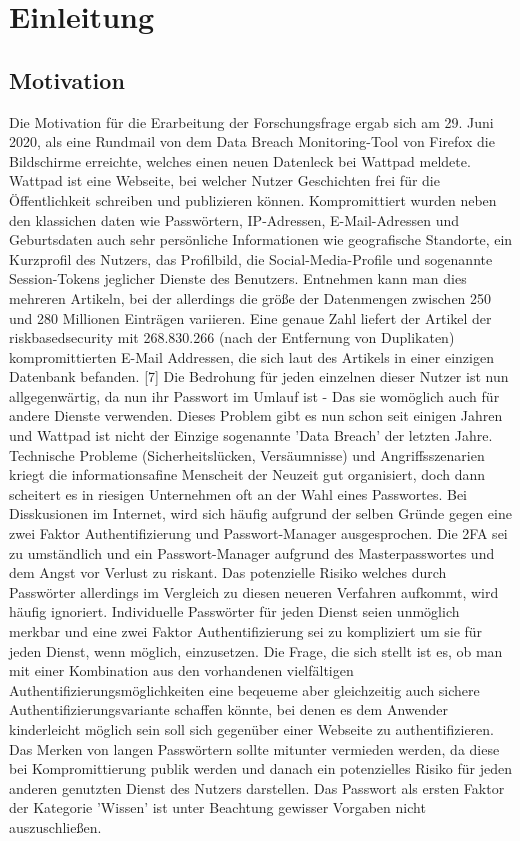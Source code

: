 \chapter{Einleitung}

\section{Motivation}
Die Motivation für die Erarbeitung der Forschungsfrage ergab sich am 29. Juni 2020, als eine Rundmail von dem Data Breach Monitoring-Tool von Firefox die Bildschirme erreichte, welches einen neuen Datenleck bei Wattpad meldete. Wattpad ist eine Webseite, bei welcher Nutzer Geschichten frei für die Öffentlichkeit schreiben und publizieren können. Kompromittiert wurden neben den klassichen daten wie Passwörtern, IP-Adressen, E-Mail-Adressen und Geburtsdaten auch sehr persönliche Informationen wie geografische Standorte, ein Kurzprofil des Nutzers, das Profilbild, die Social-Media-Profile und sogenannte Session-Tokens jeglicher Dienste des Benutzers. Entnehmen kann man dies mehreren Artikeln, bei der allerdings die größe der Datenmengen zwischen 250 und 280 Millionen Einträgen variieren. Eine genaue Zahl liefert der Artikel der riskbasedsecurity mit 268.830.266 (nach der Entfernung von Duplikaten) kompromittierten E-Mail Addressen, die sich laut des Artikels in einer einzigen Datenbank befanden. [7] Die Bedrohung für jeden einzelnen dieser Nutzer ist nun allgegenwärtig, da nun ihr Passwort im Umlauf ist - Das sie womöglich auch für andere Dienste verwenden. Dieses Problem gibt es nun schon seit einigen Jahren und Wattpad ist nicht der Einzige sogenannte 'Data Breach' der letzten Jahre. Technische Probleme (Sicherheitslücken, Versäumnisse) und Angriffsszenarien kriegt die informationsafine Menscheit der Neuzeit gut organisiert, doch dann scheitert es in riesigen Unternehmen oft an der Wahl eines Passwortes. Bei Disskusionen im Internet, wird sich häufig aufgrund der selben Gründe gegen eine zwei Faktor Authentifizierung und Passwort-Manager ausgesprochen. Die 2FA sei zu umständlich und ein Passwort-Manager aufgrund des Masterpasswortes und dem Angst vor Verlust zu riskant. Das potenzielle Risiko welches durch Passwörter allerdings im Vergleich zu diesen neueren Verfahren aufkommt, wird häufig ignoriert. Individuelle Passwörter für jeden Dienst seien unmöglich merkbar und eine zwei Faktor Authentifizierung sei zu kompliziert um sie für jeden Dienst, wenn möglich, einzusetzen. Die Frage, die sich stellt ist es, ob man mit einer Kombination aus den vorhandenen vielfältigen Authentifizierungsmöglichkeiten eine beqeueme aber gleichzeitig auch sichere Authentifizierungsvariante schaffen könnte, bei denen es dem Anwender kinderleicht möglich sein soll sich gegenüber einer Webseite zu authentifizieren. Das Merken von langen Passwörtern sollte mitunter vermieden werden, da diese bei Kompromittierung publik werden und danach ein potenzielles Risiko für jeden anderen genutzten Dienst des Nutzers darstellen. Das Passwort als ersten Faktor der Kategorie 'Wissen' ist unter Beachtung gewisser Vorgaben nicht auszuschließen.

